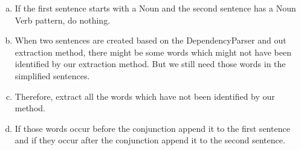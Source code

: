 \documentclass[a4paper,11pt]{article}
\begin{document}
\begin{enumerate}[(a)]
\item If the first sentence starts with a Noun and the second sentence has a Noun Verb pattern, do nothing.
\item When two sentences are created based on the DependencyParser and out extraction method, there might be some words which might not have been identified by our extraction method. But we still need those words in the simplified sentences.
\item Therefore, extract all the words which have not been identified by our method.
\item If those words occur before the conjunction append it to the first sentence and if they occur after the conjunction append it to the second sentence.

\end{enumerate}
\end{document}
